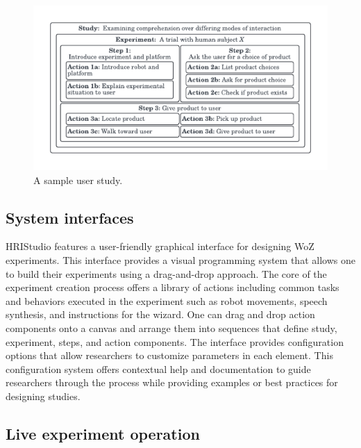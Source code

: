 \documentclass[letterpaper, 10 pt, conference]{ieeeconf}
\begin{document}

\begin{figure}[ht]
   \vskip -0.3cm
    \begin{center}
        \includegraphics[width=0.4\paperwidth]{assets/diagrams/userstudy}
        \vskip -0.5cm
        \caption{A sample user study.}
        \label{fig:userstudy}
    \end{center}
\vskip -0.7cm
\end{figure}

\subsection{System interfaces} 

HRIStudio features a user-friendly graphical interface for designing WoZ experiments. This interface provides a visual programming system that allows one to build their experiments using a drag-and-drop approach. The core of the experiment creation process offers a library of actions including common tasks and behaviors executed in the experiment such as robot movements, speech synthesis, and instructions for the wizard. One can drag and drop action components onto a canvas and arrange them into sequences that define  study, experiment, steps, and action components. The interface provides configuration options that allow researchers to customize parameters in each element. This configuration system offers contextual help and documentation to guide researchers through the process while providing examples or best practices for designing studies.

\subsection{Live experiment operation}
\end{document}
